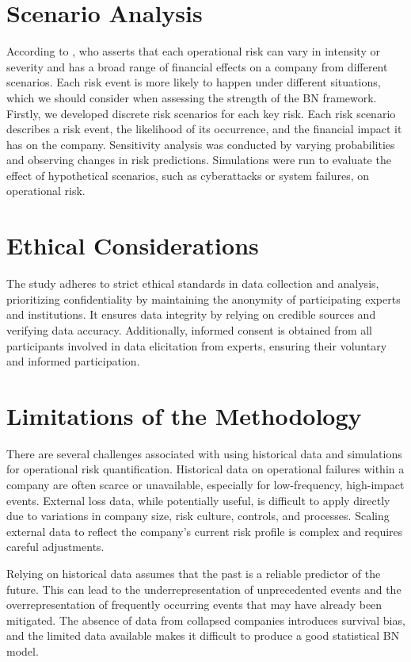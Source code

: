 \section{Scenario Analysis }
According to \textcite{Amin2016}, who asserts that each operational risk can vary in intensity or severity and has a broad range of financial effects on a company from different scenarios. Each risk event is more likely to happen under different situations, which we should consider when assessing the strength of the BN framework. Firstly, we developed discrete risk scenarios for each key risk. Each risk scenario describes a risk event, the likelihood of its occurrence, and the financial impact it has on the company. Sensitivity analysis was conducted by varying probabilities and observing changes in risk predictions. Simulations were run to evaluate the effect of hypothetical scenarios, such as cyberattacks or system failures, on operational risk.
\section{Ethical Considerations}
The study adheres to strict ethical standards in data collection and analysis, prioritizing confidentiality by maintaining the anonymity of participating experts and institutions. It ensures data integrity by relying on credible sources and verifying data accuracy. Additionally, informed consent is obtained from all participants involved in data elicitation from experts, ensuring their voluntary and informed participation.
\section{Limitations of the Methodology}
There are several challenges associated with using historical data and simulations for operational risk quantification. 
Historical data on operational failures within a company are often scarce or unavailable, especially for low-frequency, high-impact events. External loss data, while potentially useful, is difficult to apply directly due to variations in company size, risk culture, controls, and processes. Scaling external data to reflect the company’s current risk profile is complex and requires careful adjustments. 

Relying on historical data assumes that the past is a reliable predictor of the future. This can lead to the underrepresentation of unprecedented events and the overrepresentation of frequently occurring events that may have already been mitigated. The absence of data from collapsed companies introduces survival bias, and the limited data available makes it difficult to produce a good statistical BN model.

